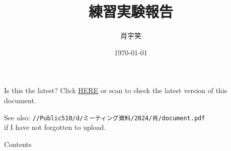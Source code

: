 \documentclass[aspectratio=43,scheme=plain]{ctexbeamer}
\title{練習実験報告}
\author{肖宇笑}
\date{\today}
\begin{document}
	\titleframe						    %
	\begin{frame}[containsverbatim]{Is this the latest?}	
Click \textcolor{blue}{\href{https://github.com/xiaoyuleiba/MachinetimeReport}{HERE}} or scan to check the latest version of this document.

See also: \verb|//Public510/d/ミーティング資料/2024/肖/document.pdf| \\if I have not forgotten to upload.
\end{frame}
	\begin{frame}{Contents}
	\tableofcontents
	\end{frame}
\end{document}
